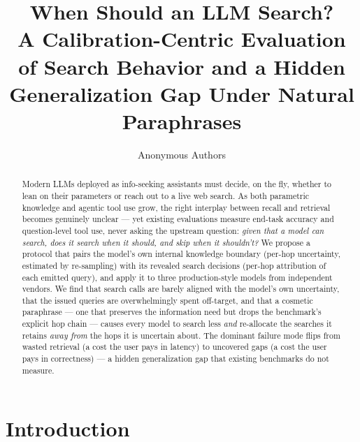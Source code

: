 \documentclass[10pt,letterpaper]{article}
\title{\textbf{When Should an LLM Search?\\
A Calibration-Centric Evaluation of Search Behavior and a Hidden Generalization Gap Under Natural Paraphrases}}
\author{Anonymous Authors}
\affil{Paper under double-blind review at ICLR 2026}
\date{}
\begin{document}
\maketitle

\begin{abstract}
Modern LLMs deployed as info-seeking assistants must decide, on the fly, whether to
lean on their parameters or reach out to a live web search. As both parametric
knowledge and agentic tool use grow, the right interplay between recall and retrieval
becomes genuinely unclear --- yet existing evaluations measure end-task accuracy and
question-level tool use, never asking the upstream question: \emph{given that a model
can search, does it search when it should, and skip when it shouldn't?} We propose a
protocol that pairs the model's own internal knowledge boundary (per-hop uncertainty,
estimated by re-sampling) with its revealed search decisions (per-hop attribution of
each emitted query), and apply it to three production-style models from independent
vendors. We find that search calls are barely aligned with the model's own
uncertainty, that the issued queries are overwhelmingly spent off-target, and that a
cosmetic paraphrase --- one that preserves the information need but drops the
benchmark's explicit hop chain --- causes every model to search less \emph{and}
re-allocate the searches it retains \emph{away from} the hops it is uncertain about.
The dominant failure mode flips from wasted retrieval (a cost the user pays in
latency) to uncovered gaps (a cost the user pays in correctness) --- a hidden
generalization gap that existing benchmarks do not measure.
\end{abstract}

\section{Introduction}
\end{document}
